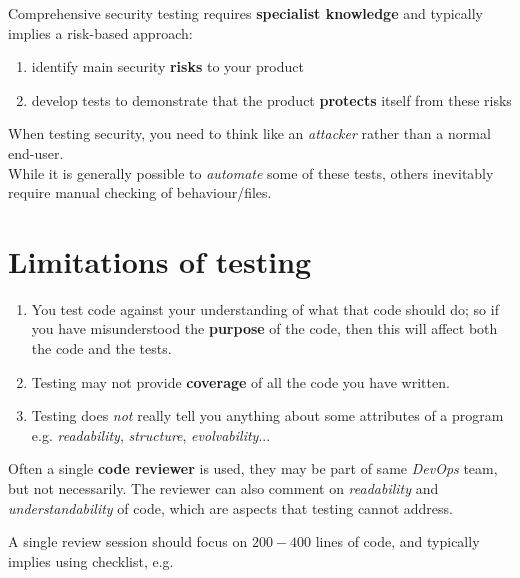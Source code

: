 Comprehensive security testing requires
\textbf{specialist knowledge} and typically implies a risk-based approach:
\begin{enumerate}
   \item identify main security \textbf{risks} to your
   product
   \item develop tests to demonstrate that the
   product \textbf{protects} itself from these risks
\end{enumerate}
When testing security, you need to think like an \textit{attacker} rather than a normal end-user.\\
While it is generally possible to \textit{automate} some of these tests,
others inevitably require manual checking
of behaviour/files.

\section{Limitations of testing}
\begin{enumerate}
   \item You test code against your understanding of what that code
   should do;
   so if you have misunderstood the \textbf{purpose} of the code,
   then this will affect both the code and the tests.
   \item Testing may not provide \textbf{coverage} of all the code you have
   written. 
   \item Testing does \textit{not} really tell you anything about some attributes
   of a program e.g. \textit{readability}, \textit{structure}, \textit{evolvability}...
\end{enumerate}

Often a single \textbf{code reviewer} is used, 
they may be part of same \textit{DevOps} team, but not necessarily.
The reviewer can also comment on \textit{readability} and \textit{understandability} of code, which are aspects that testing cannot address.

A single review session should focus on $200-400$ lines of code, and typically implies using checklist, e.g.

